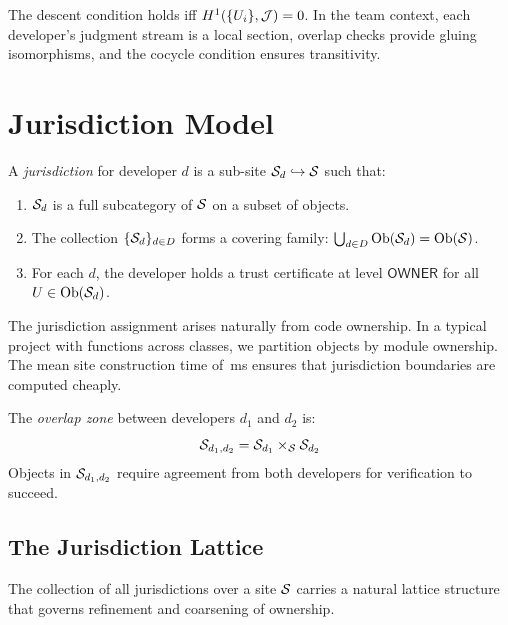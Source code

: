 \documentclass[11pt]{article}
\newcommand{\OwnerToken}{\mathsf{OWNER}}
\begin{document}
The descent condition holds iff $H^{1}(\{U_i\}, \mathcal{J}) = 0$. In the team
context, each developer's judgment stream is a local section, overlap checks
provide gluing isomorphisms, and the cocycle condition ensures transitivity.

\section{Jurisdiction Model}\label{sec:jurisdictions}

\begin{definition}[Jurisdiction]
A \emph{jurisdiction} for developer $d$ is a sub-site
$\mathcal{S}_d \hookrightarrow \mathcal{S}$ such that:
\begin{enumerate}
  \item $\mathcal{S}_d$ is a full subcategory of $\mathcal{S}$ on a subset of objects.
  \item The collection $\{\mathcal{S}_d\}_{d \in D}$ forms a covering family:
        $\bigcup_{d \in D} \mathrm{Ob}(\mathcal{S}_d) = \mathrm{Ob}(\mathcal{S})$.
  \item For each $d$, the developer holds a trust certificate at level
        $\OwnerToken$ for all $U \in \mathrm{Ob}(\mathcal{S}_d)$.
\end{enumerate}
\end{definition}

The jurisdiction assignment arises naturally from code ownership. In a typical
project with \compSiteTotalFunctions{} functions across \compSiteTotalClasses{}
classes, we partition objects by module ownership. The mean site construction
time of \compSiteMeanBuildMs{}\,ms ensures that jurisdiction boundaries are
computed cheaply.

\begin{definition}
The \emph{overlap zone} between developers $d_1$ and $d_2$ is:
\[
  \mathcal{S}_{d_1,d_2} = \mathcal{S}_{d_1} \times_{\mathcal{S}} \mathcal{S}_{d_2}
\]
Objects in $\mathcal{S}_{d_1,d_2}$ require agreement from both developers for
verification to succeed.
\end{definition}

\subsection{The Jurisdiction Lattice}

The collection of all jurisdictions over a site $\mathcal{S}$ carries a natural
lattice structure that governs refinement and coarsening of ownership.
\end{document}
